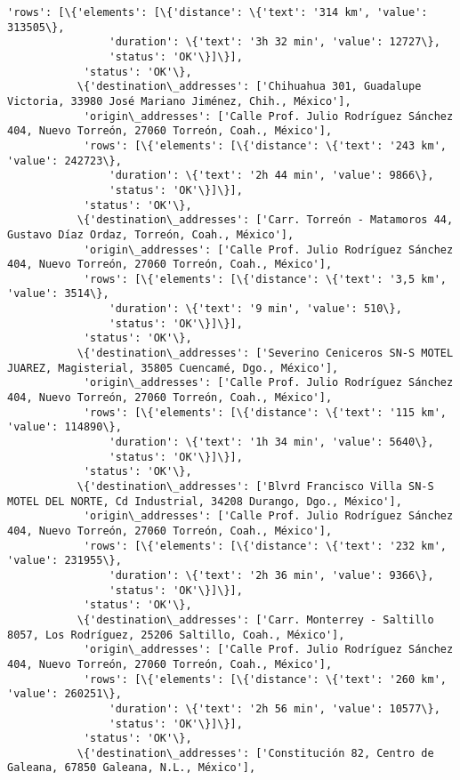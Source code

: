 \documentclass[11pt]{article}
\begin{document}
\begin{Verbatim}[commandchars=\\\{\}]
            'rows': [\{'elements': [\{'distance': \{'text': '314 km', 'value': 313505\},
                'duration': \{'text': '3h 32 min', 'value': 12727\},
                'status': 'OK'\}]\}],
            'status': 'OK'\},
           \{'destination\_addresses': ['Chihuahua 301, Guadalupe Victoria, 33980 José Mariano Jiménez, Chih., México'],
            'origin\_addresses': ['Calle Prof. Julio Rodríguez Sánchez 404, Nuevo Torreón, 27060 Torreón, Coah., México'],
            'rows': [\{'elements': [\{'distance': \{'text': '243 km', 'value': 242723\},
                'duration': \{'text': '2h 44 min', 'value': 9866\},
                'status': 'OK'\}]\}],
            'status': 'OK'\},
           \{'destination\_addresses': ['Carr. Torreón - Matamoros 44, Gustavo Díaz Ordaz, Torreón, Coah., México'],
            'origin\_addresses': ['Calle Prof. Julio Rodríguez Sánchez 404, Nuevo Torreón, 27060 Torreón, Coah., México'],
            'rows': [\{'elements': [\{'distance': \{'text': '3,5 km', 'value': 3514\},
                'duration': \{'text': '9 min', 'value': 510\},
                'status': 'OK'\}]\}],
            'status': 'OK'\},
           \{'destination\_addresses': ['Severino Ceniceros SN-S MOTEL JUAREZ, Magisterial, 35805 Cuencamé, Dgo., México'],
            'origin\_addresses': ['Calle Prof. Julio Rodríguez Sánchez 404, Nuevo Torreón, 27060 Torreón, Coah., México'],
            'rows': [\{'elements': [\{'distance': \{'text': '115 km', 'value': 114890\},
                'duration': \{'text': '1h 34 min', 'value': 5640\},
                'status': 'OK'\}]\}],
            'status': 'OK'\},
           \{'destination\_addresses': ['Blvrd Francisco Villa SN-S MOTEL DEL NORTE, Cd Industrial, 34208 Durango, Dgo., México'],
            'origin\_addresses': ['Calle Prof. Julio Rodríguez Sánchez 404, Nuevo Torreón, 27060 Torreón, Coah., México'],
            'rows': [\{'elements': [\{'distance': \{'text': '232 km', 'value': 231955\},
                'duration': \{'text': '2h 36 min', 'value': 9366\},
                'status': 'OK'\}]\}],
            'status': 'OK'\},
           \{'destination\_addresses': ['Carr. Monterrey - Saltillo 8057, Los Rodríguez, 25206 Saltillo, Coah., México'],
            'origin\_addresses': ['Calle Prof. Julio Rodríguez Sánchez 404, Nuevo Torreón, 27060 Torreón, Coah., México'],
            'rows': [\{'elements': [\{'distance': \{'text': '260 km', 'value': 260251\},
                'duration': \{'text': '2h 56 min', 'value': 10577\},
                'status': 'OK'\}]\}],
            'status': 'OK'\},
           \{'destination\_addresses': ['Constitución 82, Centro de Galeana, 67850 Galeana, N.L., México'],

\end{Verbatim}
\end{document}

